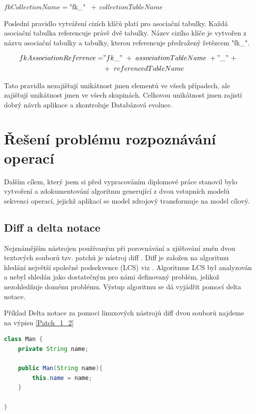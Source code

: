 \documentclass[11pt,twoside,a4paper]{book}
\begin{document}
$fkCollectionName = $"fk\_" $\ +\ collectionTableName$

Poslední pravidlo vytváření cizích klíčů platí pro asociační tabulky. Každá
asociační tabulka referencuje právě dvě tabulky. Název cizího klíče je vytvořen
z názvu asociační tabulky a tabulky, kterou referencuje předražený řetězcem
"fk\_".

\begin{align}fkAssociationReference = &"fk\_" \ +\ associationTableName\
+"\_"\ + \nonumber\\ \ & + \ referencedTableName \nonumber\end{align}


Tato pravidla nezajišťují unikátnost jmen elementů ve všech případech, ale
zajišťují unikátnost jmen ve všech skupinách. Celkovou unikátnost jmen zajistí
dobrý návrh aplikace a zkontroluje Databázová evoluce.

\chapter{Řešení problému rozpoznávání operací}\label{chapt:recognition}

Dalším cílem, který jsem si před vypracováním diplomové práce stanovil bylo
vytvoření a zdokumentování algoritmu generující z dvou vstupních modelů
sekvenci operací, jejichž aplikací se model zdrojový transformuje na model
cílový.

\section{Diff a delta notace}\label{sec:diff_and_delta_notace}
Nejznámějším nástrojen používaným při porovnávání a zjišťování změn dvou
textových souborů tzv. patchů \cite{patch} je nástroj diff \cite{diff_wiki} .
Diff je založen na algoritmu hledání největší společné podsekvence (LCS) viz
\cite{wiki_lcs}. Algoritmus LCS byl analyzován a nebyl shledán jako dostatečným
pro námi definovaný problém, jelikož nezohledňuje doménu problému. Výstup
algoritmu se dá vyjádřit pomocí delta notace.

Příklad Delta notace za pomoci linuxových
nástrojů diff dvou souborů najdeme na výpisu \ref{Patch_1_2} \\
\begin{lstlisting}[language=JAVA,frame=single,caption=Man1.java,label=Man1]
class Man {
	private String name;

	public Man(String name){
		this.name = name;
	}

}
\end{lstlisting}
\end{document}
